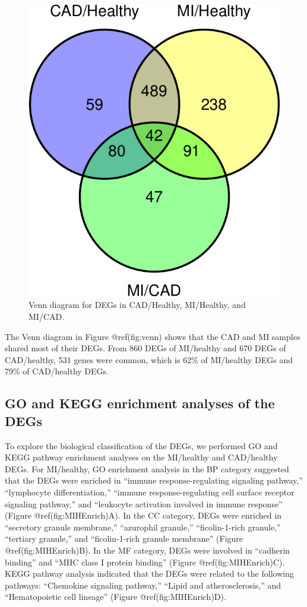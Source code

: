 \documentclass[smallextended]{svjour3}       %
\begin{document}
\begin{figure}

{\centering \includegraphics[width=0.45\linewidth]{Complete-V1_files/figure-latex/venn-1} 

}

\caption{Venn diagram for DEGs in CAD/Healthy, MI/Healthy, and MI/CAD.}\label{fig:venn}
\end{figure}

The Venn diagram in Figure @ref(fig:venn) shows that the CAD and MI
samples shared most of their DEGs. From 860 DEGs of MI/healthy and 670
DEGs of CAD/healthy, 531 genes were common, which is 62\% of MI/healthy
DEGs and 79\% of CAD/healthy DEGs.

\hypertarget{go-and-kegg-enrichment-analyses-of-the-degs}{%
\subsection{GO and KEGG enrichment analyses of the
DEGs}\label{go-and-kegg-enrichment-analyses-of-the-degs}}

To explore the biological classification of the DEGs, we performed GO
and KEGG pathway enrichment analyses on the MI/healthy and CAD/healthy
DEGs. For MI/healthy, GO enrichment analysis in the BP category
suggested that the DEGs were enriched in ``immune response-regulating
signaling pathway,'' ``lymphocyte differentiation,'' ``immune
response-regulating cell surface receptor signaling pathway,'' and
``leukocyte activation involved in immune response'' (Figure
@ref(fig:MIHEnrich)A). In the CC category, DEGs were enriched in
``secretory granule membrane,'' ``azurophil granule,'' ``ficolin-1-rich
granule,'' ``tertiary granule,'' and ``ficolin-1-rich granule membrane''
(Figure @ref(fig:MIHEnrich)B). In the MF category, DEGs were involved in
``cadherin binding'' and ``MHC class I protein binding'' (Figure
@ref(fig:MIHEnrich)C). KEGG pathway analysis indicated that the DEGs
were related to the following pathways: ``Chemokine signaling pathway,''
``Lipid and atherosclerosis,'' and ``Hematopoietic cell lineage''
(Figure @ref(fig:MIHEnrich)D).
\end{document}
